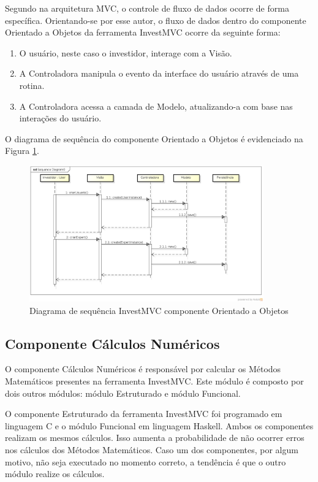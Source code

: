 Segundo  na arquitetura MVC, o controle de fluxo de dados ocorre de forma específica. Orientando-se por esse autor, o fluxo de dados dentro do componente Orientado a Objetos da ferramenta InvestMVC ocorre da seguinte forma:

\begin{enumerate}
\item O usuário, neste caso o investidor, interage com a Visão.
\item A Controladora manipula o evento da interface do usuário através de uma rotina.
\item A Controladora acessa a camada de Modelo, atualizando-a com base nas interações do usuário.
\end{enumerate}

O diagrama de sequência do componente Orientado a Objetos é evidenciado na Figura \ref{sequenciaOO}.

\begin{figure}[H]
\centering
\includegraphics[width=0.9\textwidth]{figuras/sequenciaOO}
\caption{Diagrama de sequência InvestMVC componente Orientado a Objetos}
\label{sequenciaOO}
\end{figure}

\subsection{Componente Cálculos Numéricos}

O componente Cálculos Numéricos é responsável por calcular os Métodos Matemáticos presentes na ferramenta InvestMVC. Este módulo é composto por dois outros módulos: módulo Estruturado e módulo Funcional.

O componente Estruturado da ferramenta InvestMVC foi programado em linguagem C e o módulo Funcional em linguagem Haskell. Ambos os componentes realizam os mesmos cálculos. Isso aumenta a probabilidade de não ocorrer erros nos cálculos dos Métodos Matemáticos. Caso um dos componentes, por algum motivo, não seja executado no momento correto, a tendência é que o outro módulo realize os cálculos.

